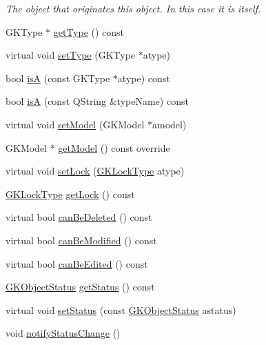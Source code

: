 \begin{DoxyCompactItemize}
\begin{DoxyCompactList}\small\item\em The object that originates this object. In this case it is itself. \end{DoxyCompactList}\item 
G\+K\+Type $\ast$ \hyperlink{classGKObject_aef2dbd7f7342fa9ca5f01917c46994cf}{get\+Type} () const 
\item 
virtual void \hyperlink{classGKObject_a765ebd500ad44121d1507655787bb10b}{set\+Type} (G\+K\+Type $\ast$atype)
\item 
bool \hyperlink{classGKObject_a0bc06a08e680c8f304a19074d3307207}{isA} (const G\+K\+Type $\ast$atype) const 
\item 
bool \hyperlink{classGKObject_af104d2d309eb86ae7defe6049d4e11fe}{isA} (const Q\+String \&type\+Name) const 
\item 
virtual void \hyperlink{classGKObject_a92c98c7bcbb8e6b8b07022a32fe80c01}{set\+Model} (G\+K\+Model $\ast$amodel)
\item 
G\+K\+Model $\ast$ \hyperlink{classGKObject_a3362b2e6a23016c44f366f8fef9eb72a}{get\+Model} () const override
\item 
virtual void \hyperlink{classGKObject_a2bc1418a21399ed05979bdd0ef7d7fdc}{set\+Lock} (\hyperlink{classGKObject_a097bd6e3a9c40a1b2d53cde7b171c851}{G\+K\+Lock\+Type} atype)
\item 
\hyperlink{classGKObject_a097bd6e3a9c40a1b2d53cde7b171c851}{G\+K\+Lock\+Type} \hyperlink{classGKObject_a4b666c8124018e78c7ab4720925ce767}{get\+Lock} () const 
\item 
virtual bool \hyperlink{classGKObject_ab177d522fe520e1a715b624fcc6ddb11}{can\+Be\+Deleted} () const 
\item 
virtual bool \hyperlink{classGKObject_a8f50f2a968b01df84a07cfd02ae0d5ff}{can\+Be\+Modified} () const 
\item 
virtual bool \hyperlink{classGKObject_ad5ac15fbbca40d75a943a8ddf73a8a7a}{can\+Be\+Edited} () const 
\item 
\hyperlink{classGKObject_ad8cb816946f2bd9e34714a830b14f3b8}{G\+K\+Object\+Status} \hyperlink{classGKObject_ab69075b7a9371ff12399ad575c1de75f}{get\+Status} () const 
\item 
virtual void \hyperlink{classGKObject_a47281a8be1b0bc03380e46ccd5b886c3}{set\+Status} (const \hyperlink{classGKObject_ad8cb816946f2bd9e34714a830b14f3b8}{G\+K\+Object\+Status} astatus)
\item 
void \hyperlink{classGKObject_a64bf09817c3a2639dda97bb2466d6d10}{notify\+Status\+Change} ()

\end{DoxyCompactItemize}
